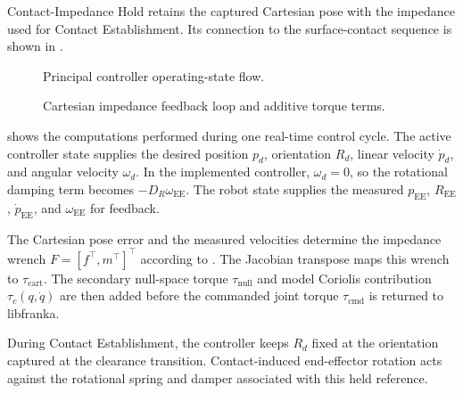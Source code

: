 
Contact-Impedance Hold retains the captured Cartesian pose with the impedance
used for Contact Establishment. Its connection to the surface-contact sequence
is shown in \mbox{}.

\begin{figure}[H]
  \centering
  
  \caption{Principal controller operating-state flow.}
  \label{fig:controller_state_flow}
\end{figure}

\begin{figure}[H]
  \centering
  
  \caption{Cartesian impedance feedback loop and additive torque terms.}
  \label{fig:controller_block_diagram}
\end{figure}

\mbox{} shows the computations performed
during one real-time control cycle. The active controller state supplies the
desired position \mbox{\(p_d\)}, orientation \mbox{\(R_d\)}, linear velocity
\mbox{\(\dot p_d\)}, and angular velocity \mbox{\(\omega_d\)}. In the
implemented controller, \mbox{\(\omega_d=0\)}, so the rotational damping term
becomes \mbox{\(-D_R\omega_{\mathrm{EE}}\)}. The robot state supplies the
measured
\mbox{\(p_{\mathrm{EE}}\)}, \mbox{\(R_{\mathrm{EE}}\)},
\mbox{\(\dot p_{\mathrm{EE}}\)}, and \mbox{\(\omega_{\mathrm{EE}}\)}
for feedback.

The Cartesian pose error and the measured velocities determine the impedance
wrench \mbox{\(F=[f^\top,m^\top]^\top\)} according to
\mbox{}.
The Jacobian transpose maps this wrench to
\mbox{\(\tau_{\mathrm{cart}}\)}. The secondary null-space torque
\mbox{\(\tau_{\mathrm{null}}\)} and model Coriolis contribution
\mbox{\(\tau_c(q,\dot q)\)} are then added before the commanded joint torque
\mbox{\(\tau_{\mathrm{cmd}}\)} is returned to libfranka.

During Contact Establishment, the controller keeps \mbox{\(R_d\)} fixed at
the orientation captured at the clearance transition. Contact-induced
end-effector rotation acts against the rotational spring and damper associated
with this held reference.


